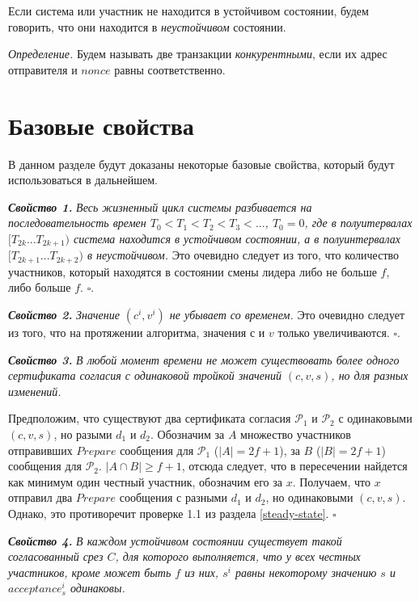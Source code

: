 Если система или участник не находится в устойчивом состоянии, будем говорить, что они находится в \textit{неустойчивом} состоянии.

\textit{Определение.} Будем называть две транзакции \textit{конкурентными}, если их адрес отправителя и $nonce$ равны соответственно.

\section{Базовые свойства}
В данном разделе будут доказаны некоторые базовые свойства, который будут использоваться в дальнейшем.

\textbf{\textit{Свойство 1.}} \textit{Весь жизненный цикл системы разбивается на последовательность времен
$T_0 < T_1 < T_2 < T_3 < ...$, $T_0=0$, где в полуитервалах $[T_{2k}...T_{2k+1})$ система находится в устойчивом состоянии, а в полуинтервалах $[T_{2k+1}...T_{2k+2})$ в неустойчивом.}
Это очевидно следует из того, что количество участников, который находятся в состоянии смены лидера либо не больше $f$, либо больше $f$. $\square$.
\vspace{10pt}

\textbf{\textit{Свойство 2.}} \textit{Значение $(c^i, v^i)$ не убывает со временем.}
Это очевидно следует из того, что на протяжении алгоритма, значения $с$ и $v$ только увеличиваются. $\square$.
\vspace{10pt}

\textbf{\textit{Свойство 3.}} \textit{В любой момент времени не может существовать более одного сертификата согласия с одинаковой тройкой значений $(c, v, s)$, но для разных изменений.} 

Предположим, что существуют два сертификата согласия $\mathcal{P}_1$ и $\mathcal{P}_2$ с одинаковыми $(c, v, s)$, но разыми $d_1$ и $d_2$. 
Обозначим за $A$ множество участников отправивших $Prepare$ сообщения для  $\mathcal{P}_1$ ($|A|=2f+1$), за $B$ ($|B|=2f+1$) сообщения для $\mathcal{P}_2$. $|A \cap B| \ge f+1$, отсюда следует, что в пересечении найдется как минимум один честный участник,  обозначим его за $x$. Получаем, что $x$ отправил два $Prepare$ сообщения с разными $d_1$ и $d_2$, но одинаковыми $(c, v, s)$. Однако, это противоречит проверке 1.1 из раздела \ref{steady-state}. $\square$
\vspace{10pt}

\textbf{\textit{Свойство 4.}} \textit{В каждом устойчивом состоянии существует такой согласованный срез $C$, для которого выполняется, что у всех честных участников, кроме может быть $f$ из них, $s^i$ равны некоторому значению $s$ и $acceptance^i_s$ одинаковы.}

